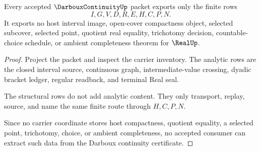 \begin{theorem}
\label{thm:darboux-continuity-nonescape}
Every accepted $\DarbouxContinuityUp$ packet exports only the finite rows
$$
I,G,V,D,R,E,H,C,P,N.
$$
It exports no host interval image, open-cover compactness object, selected subcover, selected point, quotient real equality, trichotomy decision, countable-choice schedule, or ambient completeness theorem for $\RealUp$.
\end{theorem}
\begin{proof}
Project the packet and inspect the carrier inventory. The analytic rows are the closed interval source, continuous graph, intermediate-value crossing, dyadic bracket ledger, regular readback, and terminal Real seal.

The structural rows do not add analytic content. They only transport, replay, source, and name the same finite route through $H,C,P,N$.

Since no carrier coordinate stores host compactness, quotient equality, a selected point, trichotomy, choice, or ambient completeness, no accepted consumer can extract such data from the Darboux continuity certificate.
\end{proof}




